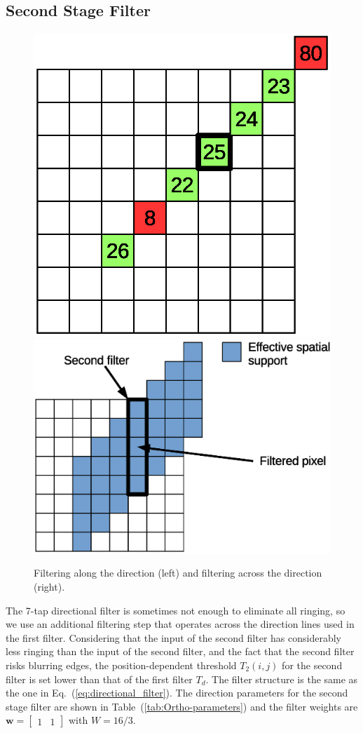 \documentclass[smallabstract,smallcaptions]{dccpaper}
\begin{document}
\subsection{Second Stage Filter}

\begin{figure}


\includegraphics[width=0.4\columnwidth]{crf_direction}\includegraphics[width=0.4\columnwidth]{crf_across}

\caption{Filtering along the direction (left) and filtering across the direction
(right)\label{fig:Filtering-along-across}. }


\end{figure}


The 7-tap directional filter is sometimes not enough to eliminate
all ringing, so we use an additional filtering step that operates
across the direction lines used in the first filter. Considering that
the input of the second filter has considerably less ringing than
the input of the second filter, and the fact that the second filter
risks blurring edges, the position-dependent threshold $T_{2}\left(i,j\right)$
for the second filter is set lower than that of the first filter $T_{d}$.
The filter structure is the same as the one in Eq.~(\ref{eq:directional_filter}).
The direction parameters for the second stage filter are shown in
Table~(\ref{tab:Ortho-parameters}) and the filter weights are $\mathbf{w}=\left[\begin{array}{cc}
1 & 1\end{array}\right]$ with $W=16/3$.

\begin{table}

\caption{Second stage filter parameters\label{tab:Ortho-parameters}}
\end{table}
\end{document}
